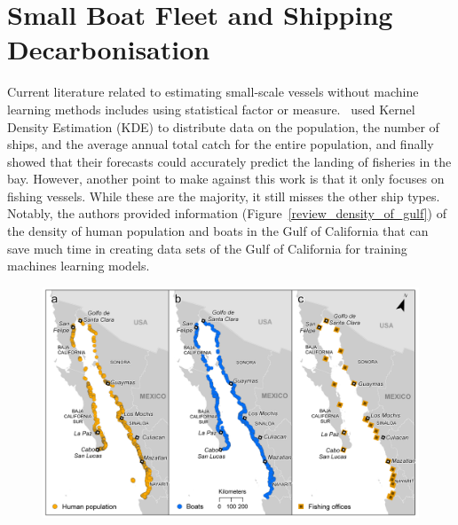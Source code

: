 
\section{Small Boat Fleet and Shipping Decarbonisation}
Current literature related to estimating small-scale vessels without machine learning methods includes using statistical factor or measure.~ used Kernel Density Estimation (KDE) to distribute data on the population, the number of ships, and the average annual total catch for the entire population, and finally showed that their forecasts could accurately predict the landing of fisheries in the bay. However, another point to make against this work is that it only focuses on fishing vessels. While these are the majority, it still misses the other ship types. Notably, the authors provided information (Figure~\ref{review_density_of_gulf}) of the density of human population and boats in the Gulf of California that can save much time in creating data sets of the Gulf of California for training machines learning models.\\

\begin{figure}[t]
\center
\includegraphics[scale=0.83]{img/review_density_of_gulf.png}
\end{figure}

